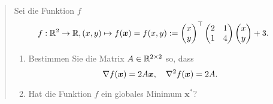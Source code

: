 \documentclass{exercise}
\begin{document}
	\begin{quote}
		Sei die Funktion \(f\)
		\[
			f: \R^2 \to \R, \parentheses*{x, y} \mapsto f\parentheses*{\bm{x}} = f\parentheses*{x, y} := \begin{pmatrix}
				x\\
				y
			\end{pmatrix}^\top \begin{pmatrix}
				2 & 1\\
				1 & 4
			\end{pmatrix}\begin{pmatrix}
				x\\
				y
			\end{pmatrix} + 3.
		\]
		\begin{enumerate}
			\item Bestimmen Sie die Matrix \(A \in \mathbb{R}^{2 \times 2}\) so, dass
			\[
				\nabla f\parentheses*{\bm{x}} = 2A\bm{x}, \quad \nabla^2 f\parentheses*{\bm{x}} = 2A.
			\]
			\item Hat die Funktion \(f\) ein globales Minimum \(\bm{x}^*\)?
		\end{enumerate}
	\end{quote}
\end{document}
